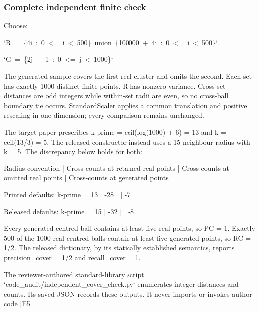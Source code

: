 \documentclass[10pt]{article}
\begin{document}
\subsubsection*{Complete independent finite check}
Choose:\par
`R = \{4i : 0 <= i < 500\} union \{100000 + 4i : 0 <= i < 500\}`\par
`G = \{2j + 1 : 0 <= j < 1000\}`\par
The generated sample covers the first real cluster and omits the second. Each set has exactly 1000 distinct finite points. R has nonzero variance. Cross-set distances are odd integers while within-set radii are even, so no cross-ball boundary tie occurs. StandardScaler applies a common translation and positive rescaling in one dimension; every comparison remains unchanged.\par
The target paper prescribes k-prime = ceil(log(1000) + 6) = 13 and k = ceil(13/3) = 5. The released constructor instead uses a 15-neighbour radius with k = 5. The discrepancy below holds for both:\par
Radius convention | Cross-counts at retained real points | Cross-counts at omitted real points | Cross-counts at generated points\par
Printed defaults: k-prime = 13 | -28 |  | -7\par
Released defaults: k-prime = 15 | -32 |  | -8\par
Every generated-centred ball contains at least five real points, so PC = 1. Exactly 500 of the 1000 real-centred balls contain at least five generated points, so RC = 1/2. The released dictionary, by its statically established semantics, reports precision\_cover = 1/2 and recall\_cover = 1.\par
The reviewer-authored standard-library script `code\_audit/independent\_cover\_check.py` enumerates integer distances and counts. Its saved JSON records these outputs. It never imports or invokes author code [E5].\par
\end{document}
